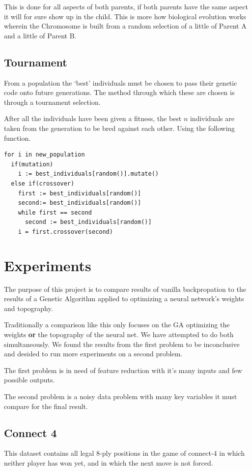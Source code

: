 \documentclass[journal]{IEEEtran}
\begin{document}
    This is done for all aspects of both parents, if both parents have the same aspect it will
    for sure show up in the child. This is more how biological evolution works wherein the
    Chromosome is built from a random selection of a little of Parent A and a little of Parent B.
    
  \subsection{Tournament}
  From a population the `best' individuals must be chosen to pass their genetic code onto future generations. 
  The method through which these are chosen is through a tournament selection.
  
  After all the individuals have been given a fitness, the best $n$ individuals are taken from
  the generation to be bred against each other. Using the following function.
  
\begin{verbatim}
for i in new_population
  if(mutation)
    i := best_individuals[random()].mutate()
  else if(crossover)
    first := best_individuals[random()]
    second:= best_individuals[random()]
    while first == second
      second := best_individuals[random()]
    i = first.crossover(second)
\end{verbatim} 

\section{Experiments}
  The purpose of this project is to compare results of vanilla backpropation to the results of
  a Genetic Algorithm applied to optimizing a neural network's weights and topography.

  Traditionally a comparison like this only focuses on the GA optimizing the weights \textbf{or}
  the topography of the neural net. We have attempted to do both simultaneously. We found the
  results from the first problem to be inconclusive and desided to run more experiments on a second
  problem.

  The first problem is in need of feature reduction with it's many inputs and few possible outputs.

  The second problem is a noisy data problem with many key variables it must compare for the final
  result.

  \subsection{Connect 4}
   This dataset contains all legal 8-ply positions in the game of
   connect-4 in which neither player has won yet, and in which the next
   move is not forced.
\end{document}
